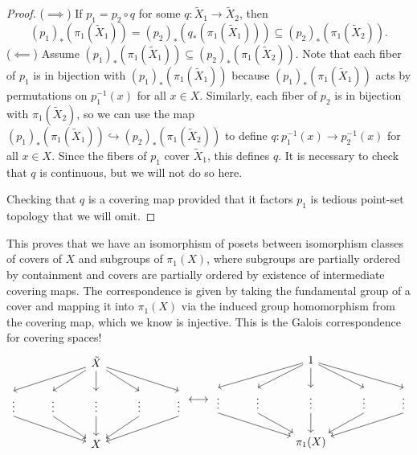 \documentclass{article}
\theoremstyle{definition}
\theoremstyle{remark}
\numberwithin{figure}{section}
\begin{document}
\begin{proof}
	($\implies$) If $p_1 = p_2 \circ q$ for some $q : \tilde X_1 \to \tilde X_2$, then
	\[
	(p_1)_*(\pi_1(\tilde X_1)) = (p_2)_*(q_*(\pi_1(\tilde X_1))) \subseteq (p_2)_*(\pi_1(\tilde X_2)).
	\]
	($\impliedby$) Assume $(p_1)_*(\pi_1(\tilde X_1)) \subseteq (p_2)_*(\pi_1(\tilde X_2))$. Note that each fiber of $p_1$ is in bijection with $(p_1)_*(\pi_1(\tilde X_1))$ because $(p_1)_*(\pi_1(\tilde X_1))$ acts by permutations on $p_1^{-1}(x)$ for all $x \in X$. Similarly, each fiber of $p_2$ is in bijection with $\pi_1(\tilde X_2)$, so we can use the map $(p_1)_*(\pi_1(\tilde X_1)) \hookrightarrow (p_2)_*(\pi_1(\tilde X_2))$ to define $q : p_1^{-1}(x) \to p_2^{-1}(x)$ for all $x \in X$. Since the fibers of $p_1$ cover $\tilde X_1$, this defines $q$. It is necessary to check that $q$ is continuous, but we will not do so here.
	
	Checking that $q$ is a covering map provided that it factors $p_1$ is tedious point-set topology that we will omit.
\end{proof}

This proves that we have an isomorphism of posets between isomorphism classes of covers of $X$ and subgroups of $\pi_1(X)$, where subgroups are partially ordered by containment and covers are partially ordered by existence of intermediate covering maps. The correspondence is given by taking the fundamental group of a cover and mapping it into $\pi_1(X)$ via the induced group homomorphism from the covering map, which we know is injective. This is the Galois correspondence for covering spaces!
\[
\begin{tikzcd}
	& & \tilde X \ar[dll, end anchor=north] \ar[dl, end anchor=north] \ar[d, end anchor=north] \ar[dr, end anchor=north] \ar[drr, end anchor=north]\\
	\vdots \ar[drr, start anchor=south] & \vdots \ar[dr, start anchor=south] & \vdots \ar[d, start anchor=south] & \vdots \ar[dl, start anchor=south] & \vdots \ar[dll, start anchor=south]\\
	& & X
\end{tikzcd}
\longleftrightarrow
\begin{tikzcd}
	& & 1 \ar[dll, end anchor=north] \ar[dl, end anchor=north] \ar[d, end anchor=north] \ar[dr, end anchor=north] \ar[drr, end anchor=north]\\
	\vdots \ar[drr, start anchor=south] & \vdots \ar[dr, start anchor=south] & \vdots \ar[d, start anchor=south] & \vdots \ar[dl, start anchor=south] & \vdots \ar[dll, start anchor=south]\\
	& & \pi_1(X)
\end{tikzcd}
\]
\end{document}
